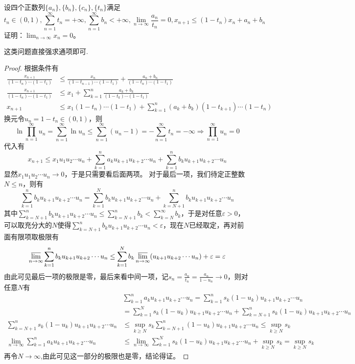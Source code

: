 \documentclass[lang=cn,newtx,10pt,scheme=chinese]{elegantbook}
\begin{document}
\begin{example}
设四个正数列\(\{a_n\},\{b_n\},\{c_n\},\{t_n\}\)满足
\[t_n\in(0,1),\sum_{n = 1}^{\infty}t_n=+\infty,\sum_{n = 1}^{\infty}b_n<+\infty,\lim_{n\rightarrow\infty}\frac{a_n}{t_n}=0,x_{n + 1}\leq(1 - t_n)x_n+a_n + b_n\]
证明：\(\lim_{n\rightarrow\infty}x_n = 0\)。
\end{example}
\begin{note}
这类问题直接强求通项即可.
\end{note}
\begin{proof}
根据条件有
\begin{align*}
\frac{x_{n + 1}}{(1 - t_n)\cdots(1 - t_1)}&\leq\frac{x_n}{(1 - t_{n-1})\cdots(1 - t_1)}+\frac{a_n + b_n}{(1 - t_n)\cdots(1 - t_1)}\\
\frac{x_{n + 1}}{(1 - t_n)\cdots(1 - t_1)}&\leq x_1+\sum_{k = 1}^{n}\frac{a_k + b_k}{(1 - t_k)\cdots(1 - t_1)}\\
x_{n + 1}&\leq x_1(1 - t_n)\cdots(1 - t_1)+\sum_{k = 1}^{n}(a_k + b_k)(1 - t_{k + 1})\cdots(1 - t_n)
\end{align*}
换元令\(u_n = 1 - t_n\in(0,1)\)，则
\[\ln\prod_{n = 1}^{\infty}u_n=\sum_{n = 1}^{\infty}\ln u_n\leq\sum_{n = 1}^{\infty}(u_n - 1)=-\sum_{n = 1}^{\infty}t_n=-\infty\Rightarrow\prod_{n = 1}^{\infty}u_n = 0\]
代入有
\[x_{n + 1}\leq x_1u_1u_2\cdots u_n+\sum_{k = 1}^{n}a_ku_{k + 1}u_{k + 2}\cdots u_n+\sum_{k = 1}^{n}b_ku_{k + 1}u_{k + 2}\cdots u_n\]
显然\(x_1u_1u_2\cdots u_n\rightarrow0\)，于是只需要看后面两项。
对于最后一项，我们待定正整数\(N\leq n\)，则有
\[\sum_{k = 1}^{n}b_ku_{k + 1}u_{k + 2}\cdots u_n=\sum_{k = 1}^{N}b_ku_{k + 1}u_{k + 2}\cdots u_n+\sum_{k = N + 1}^{n}b_ku_{k + 1}u_{k + 2}\cdots u_n\]
其中\(\sum_{k = N + 1}^{n}b_ku_{k + 1}u_{k + 2}\cdots u_n\leq\sum_{k = N + 1}^{n}b_k<\sum_{k = N}^{\infty}b_k\)，于是对任意\(\varepsilon>0\)，可以取充分大的\(N\)使得\(\sum_{k = N + 1}^{n}b_ku_{k + 1}u_{k + 2}\cdots u_n<\varepsilon\)，现在\(N\)已经取定，再对前面有限项取极限有
\[\varlimsup_{n\rightarrow\infty}\sum_{k = 1}^{n}b_ku_{k + 1}u_{k + 2}\cdots u_n\leq\sum_{k = 1}^{N}b_k\varlimsup_{n\rightarrow\infty}(u_{k + 1}u_{k + 2}\cdots u_n)+\varepsilon=\varepsilon\]
由此可见最后一项的极限是零，最后来看中间一项，记\(s_n=\frac{a_n}{t_n}=\frac{a_n}{1 - u_n}\rightarrow0\)，则对任意\(N\)有
\begin{align*}
&\sum_{k = 1}^{n}a_ku_{k + 1}u_{k + 2}\cdots u_n=\sum_{k = 1}^{n}s_k(1 - u_k)u_{k + 1}u_{k + 2}\cdots u_n\\
&=\sum_{k = 1}^{N}s_k(1 - u_k)u_{k + 1}u_{k + 2}\cdots u_n+\sum_{k = N + 1}^{n}s_k(1 - u_k)u_{k + 1}u_{k + 2}\cdots u_n\\
\sum_{k = N + 1}^{n}s_k(1 - u_k)u_{k + 1}u_{k + 2}\cdots u_n&\leq\sup_{k\geq N}s_k\sum_{k = N + 1}^{n}(1 - u_k)u_{k + 1}u_{k + 2}\cdots u_n\leq\sup_{k\geq N}s_k\\
\lim_{n\rightarrow\infty}\sum_{k = 1}^{n}a_ku_{k + 1}u_{k + 2}\cdots u_n&\leq\lim_{n\rightarrow\infty}\sum_{k = 1}^{N}s_k(1 - u_k)u_{k + 1}u_{k + 2}\cdots u_n+\sup_{k\geq N}s_k=\sup_{k\geq N}s_k
\end{align*}
再令$N\to \infty$,由此可见这一部分的极限也是零，结论得证。
\end{proof}
\end{document}
